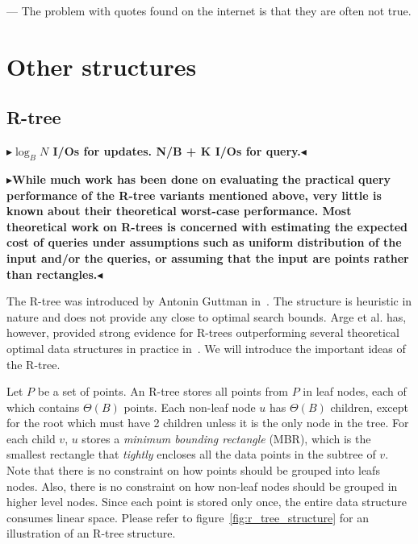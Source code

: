 \documentclass[twoside,11pt,openright]{report}
\newcommand{\todo}[1]{{\color[rgb]{.5,0,0}\textbf{$\blacktriangleright$#1$\blacktriangleleft$}}}
\begin{document}
\begin{savequote}[0.4\textwidth]
--- The problem with quotes found on the internet is that they are often not true.
\end{savequote}
\chapter{Other structures}
\label{chp:other_structures}
\section{R-tree}

\todo{$\log_B N$ I/Os for updates. N/B + K I/Os for query.}

\todo{While much work has been done on evaluating the practical
query performance of the R-tree variants mentioned
above, very little is known about their theoretical worst-case
performance. Most theoretical work on R-trees is concerned
with estimating the expected cost of queries under assumptions
such as uniform distribution of the input and/or the
queries, or assuming that the input are points rather than
rectangles.}

The R-tree was introduced by Antonin Guttman in~\cite{Guttman:1984:RDI:602259.602266}. The structure is heuristic in nature and does not provide any close to optimal search bounds. Arge et al. has, however, provided strong evidence for R-trees outperforming several theoretical optimal data structures in practice in~\cite{Arge:2008:PRP:1328911.1328920}. We will introduce the important ideas of the R-tree.

Let $P$ be a set of points. An R-tree stores all points from $P$ in leaf nodes, each of which contains $\Theta(B)$ points. Each non-leaf node $u$ has $\Theta(B)$ children, except for the root which must have 2 children unless it is the only node in the tree. For each child $v$, $u$ stores a \textit{minimum bounding rectangle} (MBR), which is the smallest rectangle that \textit{tightly} encloses all the data points in the subtree of $v$. Note that there is no constraint on how points should be grouped into leafs nodes. Also, there is no constraint on how non-leaf nodes should be grouped in higher level nodes. Since each point is stored only once, the entire data structure consumes linear space. Please refer to figure~\ref{fig:r_tree_structure} for an illustration of an R-tree structure.
\end{document}
